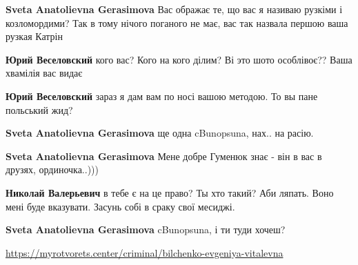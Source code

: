 \begin{itemize}
\begin{itemize}
\textbf{Sveta Anatolievna Gerasimova} Вас ображає те, що вас я називаю рузкіми і козломордими?
Так в тому нічого поганого не має, вас так назвала першою ваша рузкая Катрін


\textbf{Юрий Веселовский} кого вас? Кого на кого ділим? Ві это шото особлівоє?? Ваша хвамілія вас видає🤣🤣


\textbf{Юрий Веселовский} зараз я дам вам по носі вашою методою. То вы пане польський жид?


\textbf{Sveta Anatolievna Gerasimova} ще одна cBunopsuna, нах.. на расію.


\textbf{Sveta Anatolievna Gerasimova} Мене добре Гуменюк знає - він в вас в друзях, ординочка..)))


\textbf{Николай Валерьевич} в тебе є на це право? Ты хто такий? Аби ляпать. Воно мені буде вказувати. Засунь собі в сраку свої месиджі.


\textbf{Sveta Anatolievna Gerasimova} cBunopsuna, і ти туди хочеш?

\url{https://myrotvorets.center/criminal/bilchenko-evgeniya-vitalevna}



\end{itemize}
\end{itemize}
